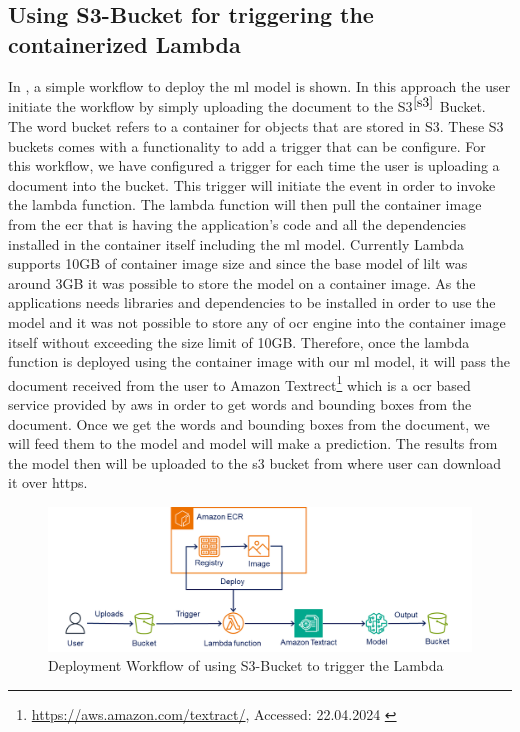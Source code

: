 \subsection{Using S3-Bucket for triggering the containerized Lambda \label{s3_deployment}}

In , a simple workflow to deploy the \acrshort{ml} model is shown. In this approach the user initiate the workflow by simply uploading the document to the S3\(^{\ref{s3}}\) Bucket. The word bucket refers to a container for objects that are stored in S3. These S3 buckets comes with a functionality to add a trigger that can be configure. For this workflow, we have configured a trigger for each time the user is uploading a document into the bucket. This trigger will initiate the event in order to invoke the lambda function. The lambda function will then pull the container image from the \acrshort{ecr} that is having the application's code and all the dependencies installed in the container itself including the \acrshort{ml} model. Currently Lambda supports 10GB of container image size and since the base model of \acrshort{lilt} was around 3GB it was possible to store the model on a container image. As the applications needs libraries and dependencies to be installed in order to use the model and it was not possible to store any of \acrshort{ocr} engine into the container image itself without exceeding the size limit of 10GB. Therefore, once the lambda function is deployed using the container image with our \acrshort{ml} model, it will pass the document received from the user to Amazon Textrect\footnote{\url{https://aws.amazon.com/textract/}, Accessed: 22.04.2024 \label{textract}} which is a \acrshort{ocr} based service provided by \acrshort{aws} in order to get words and bounding boxes from the document. Once we get the words and bounding boxes from the document, we will feed them to the model and model will make a prediction. The results from the model then will be uploaded to the s3 bucket from where user can download it over \acrshort{https}. 


\begin{figure}[!ht]
    \centering
    \includegraphics[width=1 \textwidth]{chapters/images/Methods/Deployment/s3_trigger.png}
    \caption{Deployment Workflow of using S3-Bucket to trigger the Lambda}
    \label{fig:s3-trigger-workflow}
\end{figure}



